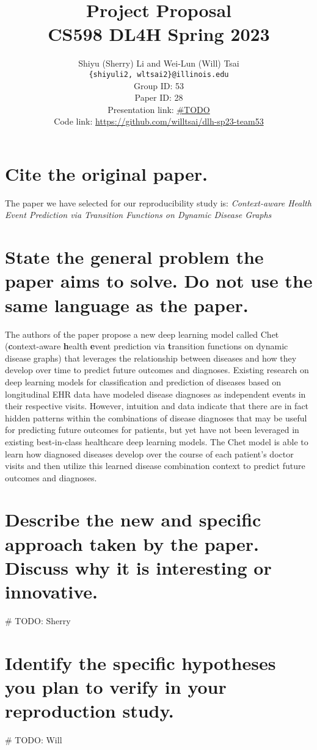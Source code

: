 \documentclass[11pt,a4paper]{article}
\title{
  Project Proposal \\
  CS598 DL4H Spring 2023
  }
\author{Shiyu (Sherry) Li and Wei-Lun (Will) Tsai \\
  \texttt{\{shiyuli2, wltsai2\}@illinois.edu}
  \\[2em]
  Group ID: 53\\
  Paper ID: 28\\
  Presentation link: \url{\#TODO} \\
  Code link: \url{https://github.com/willtsai/dlh-sp23-team53}}
\begin{document}
\maketitle


\section{Cite the original paper.}
The paper we have selected for our reproducibility study is: 
\textit{Context-aware Health Event Prediction via Transition 
Functions on Dynamic Disease Graphs} \cite{chet}

\section{State the general problem the paper aims to solve. Do not
use the same language as the paper.}
The authors of the paper propose a new deep learning model called Chet
(\textbf{c}ontext-aware \textbf{h}ealth \textbf{e}vent prediction via
\textbf{t}ransition functions on dynamic disease graphs) that leverages the
relationship between diseases and how they develop over time to predict future
outcomes and diagnoses. Existing research on deep learning models for
classification and prediction of diseases based on longitudinal EHR data have
modeled disease diagnoses as independent events in their respective visits.
However, intuition and data indicate that there are in fact hidden patterns
within the combinations of disease diagnoses that may be useful for predicting
future outcomes for patients, but yet have not been leveraged in existing
best-in-class healthcare deep learning models. The Chet model is able to learn
how diagnosed diseases develop over the course of each patient's doctor visits
and then utilize this learned disease combination context to predict future
outcomes and diagnoses. 

\section{Describe the new and specific approach taken by the
paper. Discuss why it is interesting or innovative.}
\# TODO: Sherry

\section{Identify the specific hypotheses you plan to verify in your
reproduction study.}
\# TODO: Will
\end{document}
